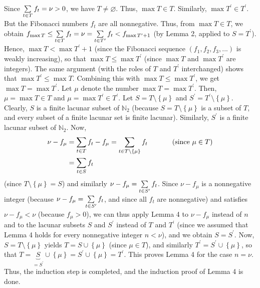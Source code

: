 \documentclass[numbers=enddot,12pt,final,onecolumn,notitlepage]{scrartcl}%
\numberwithin{exer}{section}
\theoremstyle{definition}
\let\sumnonlimits\sum
\renewcommand{\sum}{\sumnonlimits\limits}
\begin{document}
Since $\sum\limits_{t\in T}f_{t}=\nu>0$, we have $T\neq\varnothing$. Thus,
$\max T\in T$. Similarly, $\max T^{\prime}\in T^{\prime}$. But the Fibonacci
numbers $f_{t}$ are all nonnegative. Thus, from $\max T \in T$, we obtain
$f_{\max T}\leq\sum\limits_{t\in T}f_{t}=\nu=\sum\limits_{t\in T^{\prime}%
}f_{t}<f_{\max T^{\prime}+1}$ (by Lemma 2, applied to $S=T^{\prime}$). Hence,
$\max T<\max T^{\prime}+1$ (since the Fibonacci sequence $\left(  f_{1}%
,f_{2},f_{3},...\right)  $ is weakly increasing), so that $\max T\leq\max
T^{\prime}$ (since $\max T$ and $\max T^{\prime}$ are integers). The same
argument (with the roles of $T$ and $T^{\prime}$ interchanged) shows that
$\max T^{\prime}\leq\max T$. Combining this with $\max T\leq\max T^{\prime}$,
we get $\max T=\max T^{\prime}$. Let $\mu$ denote the number $\max T=\max
T^{\prime}$. Then, $\mu=\max T\in T$ and $\mu=\max T^{\prime}\in T^{\prime}$.
Let $S=T\setminus\left\{  \mu\right\}  $ and $S^{\prime}=T^{\prime}%
\setminus\left\{  \mu\right\}  $. Clearly, $S$ is a finite lacunar subset of
$\mathbb{N}_{2}$ (because $S=T\setminus\left\{  \mu\right\}  $ is a subset of
$T$, and every subset of a finite lacunar set is finite lacunar). Similarly,
$S^{\prime}$ is a finite lacunar subset of $\mathbb{N}_{2}$. Now,%
\begin{align*}
\nu-f_{\mu}  &  =\sum\limits_{t\in T}f_{t}-f_{\mu}=\sum\limits_{t\in
T\setminus\left\{  \mu\right\}  }f_{t}\ \ \ \ \ \ \ \ \ \ \left(  \text{since
}\mu\in T\right) \\
&  =\sum\limits_{t\in S}f_{t}%
\end{align*}
(since $T\setminus\left\{  \mu\right\}  =S$) and similarly $\nu-f_{\mu}%
=\sum\limits_{t\in S^{\prime}}f_{t}$. Since $\nu-f_{\mu}$ is a nonnegative
integer (because $\nu-f_{\mu}=\sum\limits_{t\in S^{\prime}}f_{t}$, and since
all $f_{t}$ are nonnegative) and satisfies $\nu-f_{\mu}<\nu$ (because $f_{\mu
}> 0$), we can thus apply Lemma 4 to $\nu-f_{\mu}$ instead of $n$ and to the
lacunar subsets $S$ and $S^{\prime}$ instead of $T$ and $T^{\prime}$ (since we
assumed that Lemma 4 holds for every nonnegative integer $n<\nu$), and we
obtain $S=S^{\prime}$. Now, $S=T\setminus\left\{  \mu\right\}  $ yields
$T=S\cup\left\{  \mu\right\}  $ (since $\mu\in T$), and similarly $T^{\prime
}=S^{\prime}\cup\left\{  \mu\right\}  $, so that $T=\underbrace{S}%
_{=S^{\prime}}\cup\left\{  \mu\right\}  =S^{\prime}\cup\left\{  \mu\right\}
=T^{\prime}$. This proves Lemma 4 for the case $n=\nu$. Thus, the induction
step is completed, and the induction proof of Lemma 4 is done.
\end{document}
